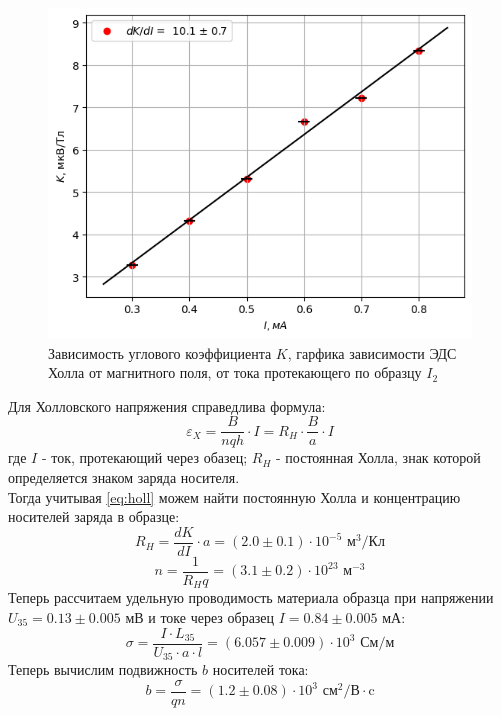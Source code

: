 \begin{figure}
    \centering
    \includegraphics[width=14cm]{images/plot3.png}
    \caption{Зависимость углового коэффициента $K$, гарфика зависимости ЭДС Холла от магнитного поля, от тока протекающего по образцу $I_2$}
\end{figure}

\indent Для Холловского напряжения справедлива формула:
\begin{equation}
    \varepsilon_X = \frac{B}{nqh}\cdot I = R_H\cdot \frac{B}{a}\cdot I\label{eq:holl}
\end{equation}
\indent где $I$ - ток, протекающий через обазец; $R_H$ - постоянная Холла, знак которой определяется знаком заряда носителя.\\
\indent Тогда учитывая \ref{eq:holl} можем найти постоянную Холла и концентрацию носителей заряда в образце:
\begin{equation}
    R_H = \frac{dK}{dI} \cdot a = (2.0 \pm 0.1)\cdot 10^{-5} \text{ м}^3 / \text{Кл}
\end{equation}
\begin{equation}
n = \frac{1}{R_H q} = (3.1 \pm 0.2) \cdot 10^{23} \text{ м}^{-3}
\end{equation}
\indent Теперь рассчитаем удельную проводимость материала образца при напряжении \\$U_{35} = 0.13\pm 0.005$ мВ и токе через образец $I = 0.84\pm 0.005$ мА:
\begin{equation}
    \sigma =\frac {I\cdot L_{35}}{U_{35}\cdot a \cdot l} = (6.057 \pm 0.009)\cdot 10^3 \text{ См/м}
\end{equation}
\indent Теперь вычислим подвижность $b$ носителей тока:
\begin{equation}
    b = \frac{\sigma}{q n} = (1.2\pm 0.08)\cdot 10^{3}\text{ см}^2/ \text{В}\cdot\text{c}
\end{equation}

